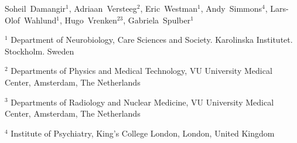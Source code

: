 Soheil~Damangir$^1$, 
Adriaan~Versteeg$^2$, 
Eric~Westman$^1$, 
Andy~Simmons$^4$, 
Lars-Olof~Wahlund$^1$, 
Hugo~Vrenken$^{23}$, 
Gabriela~Spulber$^1$

$^1$ Department of Neurobiology, Care Sciences and Society. Karolinska Institutet. Stockholm. Sweden

$^2$ Departments of Physics and Medical Technology, VU University Medical Center, Amsterdam, The Netherlands

$^3$ Departments of Radiology and Nuclear Medicine, VU University Medical Center, Amsterdam, The Netherlands

$^4$ Institute of Psychiatry, King's College London, London, United Kingdom
  
  
  
  
  
  